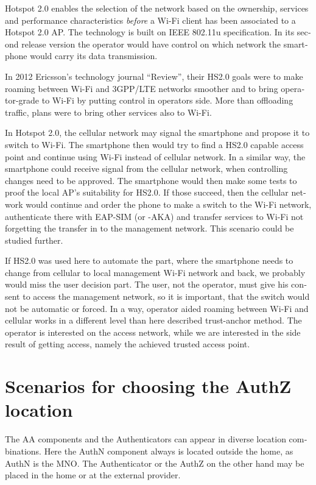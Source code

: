\documentclass[12pt,a4paper,english]{tutthesis}
\begin{document}
\begin{otherlanguage}{english}
Hotspot 2.0
enables the selection of the network based on the ownership, services and
performance characteristics \emph{before} a Wi-Fi client has been associated
to a Hotspot 2.0 AP. The technology is built on IEEE 802.11u specification. 
In its second release version the operator would
have control on which network the smartphone would carry its data
transmission. 





In 2012 Ericsson's technology journal ``Review'', their 
HS2.0 goals were to make roaming between Wi-Fi and 3GPP/LTE networks smoother
and to bring operator-grade to Wi-Fi by putting control in operators side. More
than offloading traffic, plans were to bring other services also to Wi-Fi.\cite{er-seamless}

In Hotspot 2.0, the cellular network may signal the smartphone and
propose it to switch to Wi-Fi. The smartphone then would try to find a HS2.0 capable
access point and continue using Wi-Fi instead of cellular network.
In a similar way, the smartphone could receive signal from the cellular
network, when controlling changes need to be approved. The smartphone
would then make some tests to proof the local AP's suitability for 
HS2.0. If those succeed, then the cellular network would continue and order the 
phone to make a switch to the Wi-Fi network, authenticate there with 
EAP-SIM (or -AKA) and transfer services to Wi-Fi not forgetting 
the transfer in to the management network. This scenario could be 
studied further.


If HS2.0 was used here to automate the part, where
the smartphone needs to change from cellular to local
management Wi-Fi network and back, we probably would
miss the user decision part. The user, not the operator,
 must give his consent to access the management network, so
it is important, that the switch would not be automatic or forced.
In a way, operator aided roaming between Wi-Fi and cellular
works in a different level than here described trust-anchor method.
The operator is interested on the access network, while
we are interested in the side result of getting access, namely 
the achieved trusted access point.


\section{Scenarios for choosing the AuthZ location}
\label{sec-4-6}


The AA components and the Authenticators can appear in 
diverse location combinations. Here the AuthN component 
always is located outside the home, as AuthN is the MNO.
The Authenticator or the AuthZ on the other hand
may be placed in the home or at the external provider.


\end{otherlanguage}
\end{document}
